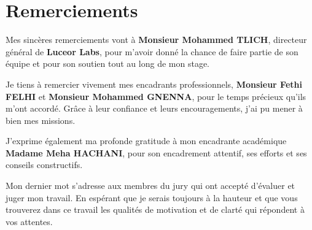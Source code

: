 \chapter*{\huge Remerciements}
\begingroup
\it \Large

Mes sincères remerciements vont à \textbf{Monsieur Mohammed TLICH}, directeur général de \textbf{Luceor Labs}, pour m'avoir donné la chance de faire partie de son équipe et pour son soutien tout au long de mon stage.

\vspace{2mm} \par
Je tiens à remercier vivement mes encadrants professionnels, \textbf{Monsieur Fethi FELHI} et \textbf{Monsieur Mohammed GNENNA}, pour le temps précieux qu'ils m'ont accordé. Grâce à leur confiance et leurs encouragements, j'ai pu mener à bien mes missions.

\vspace{2mm} \par
J'exprime également ma profonde gratitude à mon encadrante académique \textbf{Madame Meha HACHANI}, pour son encadrement attentif, ses efforts et ses conseils constructifs.

\vspace{2mm} \par
Mon dernier mot s’adresse aux membres du jury qui ont accepté d’évaluer et juger mon travail. En espérant que je serais toujours à la hauteur et que vous trouverez dans ce travail les qualités de motivation et de clarté qui répondent à vos attentes.

\endgroup